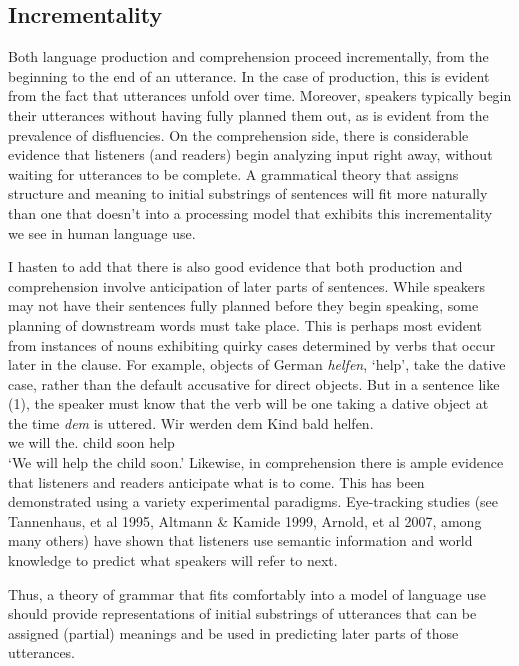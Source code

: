 \documentclass[a4paper]{article}
\begin{document}
\subsection{Incrementality}

Both language production and comprehension proceed incrementally, from the beginning to the end of an utterance.  In the case of production, this is evident from the fact that utterances unfold over time.  Moreover, speakers typically begin their utterances without having fully planned them out, as is evident from the prevalence of disfluencies.  On the comprehension side, there is considerable evidence that listeners (and readers) begin analyzing input right away, without waiting for utterances to be complete.  A grammatical theory that assigns structure and meaning to initial substrings of sentences will fit more naturally than one that doesn't into a processing model that exhibits this incrementality we see in human language use.  

I hasten to add that there is also good evidence that both production and comprehension involve anticipation of later parts of sentences.  While speakers may not have their sentences fully planned before they begin speaking, some planning of downstream words must take place.  This is perhaps most evident from instances of nouns exhibiting quirky cases determined by verbs that occur later in the clause.  For example, objects of German {\it helfen}, `help', take the dative case, rather than the default accusative for direct objects.  But in a sentence like (1), the speaker must know that the verb will be one taking a dative object at the time {\it dem} is uttered.
\ea
\gll Wir werden dem        Kind bald helfen.\\
     we will    the.\DAT{} child soon help\\\german
\glt `We will help the child soon.'
\z
Likewise, in comprehension there is ample evidence that listeners and readers anticipate what is to come.  This has been demonstrated using a variety experimental paradigms.  Eye-tracking studies (see Tannenhaus, et al 1995, Altmann \& Kamide 1999, Arnold, et al 2007, among many others) have shown that listeners use semantic information and world knowledge to predict what speakers will refer to next.

Thus, a theory of grammar that fits comfortably into a model of language use should provide representations of initial substrings of utterances that can be assigned (partial) meanings and be used in predicting later parts of those utterances.
\end{document}
